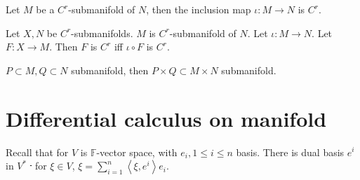 \begin{proposition}
    Let  $ M  $ be a  $ C^r $-submanifold of  $ N  $, then the inclusion map $ \iota:M\rightarrow N $ is  $ C^r $.  
\end{proposition}
\begin{proposition}
    Let  $ X, N  $ be  $ C^r $-submanifolds.  $ M  $ is  $ C^r $-submanifold of  $ N  $. Let  $ \iota:M\rightarrow N $. Let  $ F:X\rightarrow M $. Then  $ F  $ is  $ C^r $ iff  $ \iota\circ F  $ is  $ C^r $.    
\end{proposition}
\begin{example}
     $ P\subset M,Q\subset N $ submanifold, then  $ P\times Q\subset M\times N  $ submanifold.
\end{example}
\section{Differential calculus on manifold}
Recall that for  $ V  $ is  $ \mathbb{F} $-vector space, with $ e_i,1 \leq i  \leq n $ basis. There is dual basis  $ e^i $ in  $ V^* $ \st\,  for  $ \xi \in V $,  $ \xi=\sum\limits_{i=1}^n  \left< \xi,e^i \right>  e_i $.  
